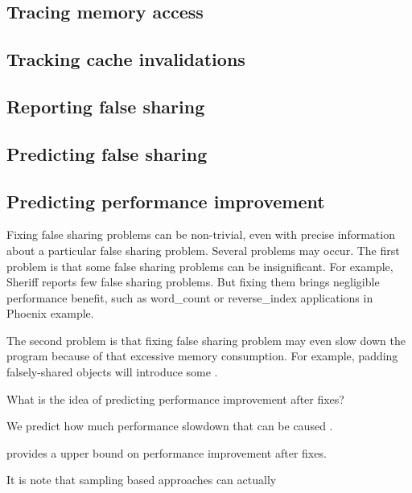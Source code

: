 \label{sec:implement}

\subsection{Tracing memory access}
\subsection{Tracking cache invalidations}
\subsection{Reporting false sharing}
\subsection{Predicting false sharing}
\subsection{Predicting performance improvement}

\label{sec:predictimprove}

Fixing false sharing problems can be non-trivial, even with precise information about a particular false sharing problem. Several problems may occur. 
The first problem is that some false sharing problems can be insignificant. 
For example, Sheriff reports few false sharing problems. But fixing them brings negligible performance benefit, such as word\_count or reverse\_index applications in Phoenix example. 

The second problem is that fixing false sharing problem may even slow down the program because of that excessive memory consumption. For example, padding falsely-shared objects will introduce some . 

What is the idea of predicting performance improvement after fixes?  

We predict how much performance slowdown that can be caused . 

\cheetah{} provides a upper bound on performance improvement after fixes. 

It is note that sampling based approaches can actually 








 